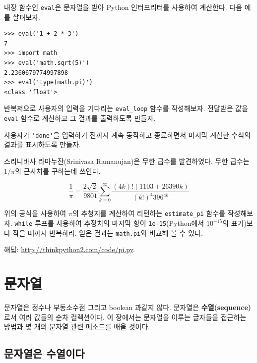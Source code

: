 \documentclass[10pt]{book}
\begin{document}
\begin{exercise}

내장 함수인 {\tt eval}은 문자열을 받아 Python 인터프리터를 사용하여
계산한다.  다음 예를 살펴보자.

\begin{verbatim}
>>> eval('1 + 2 * 3')
7
>>> import math
>>> eval('math.sqrt(5)')
2.2360679774997898
>>> eval('type(math.pi)')
<class 'float'>
\end{verbatim}
%
반복저으로 사용자의 입력을 기다리는 \verb"eval_loop" 함수를
작성해보자.  전달받은 값을 {\tt eval} 함수로 계산하고 그 결과를
출력하도록 만들자.

사용자가 \verb"'done'"을 입력하기 전까지 계속 동작하고 종료하면서
마지막 계산한 수식의 결과를 표시하도록 만들자.

\end{exercise}


\begin{exercise}

스리니바사 라마누잔(Srinivasa Ramanujan)은 무한 급수를 발견하였다.
무한 급수는 $1 / \pi$의 근사치를 구하는데 쓰인다.

\[ \frac{1}{\pi} = \frac{2\sqrt{2}}{9801} 
\sum^\infty_{k=0} \frac{(4k)!(1103+26390k)}{(k!)^4 396^{4k}} \]

위의 공식을 사용하여 $\pi$의 추청지를 계산하여 리턴하는
\verb"estimate_pi" 함수를 작성해보자.  {\tt while} 루프를 사용하여
추정치의 마지막 항이 {\tt 1e-15}(Python에서 $10^{-15}$의 표기)보다 작을
때까지 반복하라.  얻은 결과는 {\tt math.pi}와 비교해 볼 수 있다.

해답: \url{http://thinkpython2.com/code/pi.py}.

\end{exercise}


\chapter{문자열}
\label{strings}

문자열은 정수나 부동소수점 그리고 boolean 과같지 않다.  문자열은 {\bf
  수열(sequence)}로서 여러 값들의 순차 컬렉션이다.  이 장에서는
문자열을 이루는 글자들을 접근하는 방법과 몇 개의 문자열 관련 메소드를
배울 것이다.

\section{문자열은 수열이다}
\end{document}
